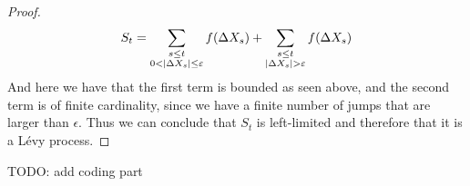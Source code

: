\begin{proof}
\[ 
    S_t = \sum_{\begin{subarray}{c} s\leq t \\ 0 < |\Delta X_s| \leq \epsilon
    \end{subarray}} f(\Delta X_s) + \sum_{\begin{subarray}{c} s\leq t \\ |\Delta
    X_s| > \epsilon \end{subarray}} f(\Delta X_s)
\]
And here we have that the first term is bounded as seen above, and the second
term is of finite cardinality, since we have a finite number of jumps that are
larger than $\epsilon$. Thus we can conclude that $S_t$ is left-limited and
therefore that it is a L\'evy process.
\end{proof}

TODO: add coding part
